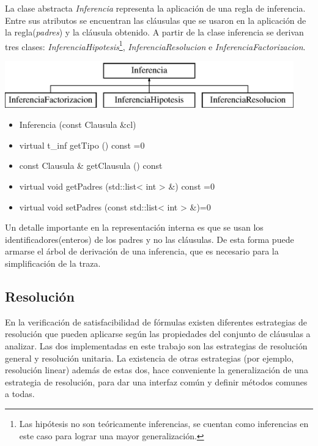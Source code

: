 \documentclass[a4paper,12pt]{article}
\begin{document}
La clase abstracta \emph{Inferencia} representa la aplicación de una regla de inferencia. Entre sus atributos se encuentran
las cláusulas que se usaron en la aplicación de la regla(\emph{padres}) y la cláusula obtenido. A partir de
la clase inferencia se derivan tres clases: \emph{InferenciaHipotesis}\footnote{Las hipótesis no son teóricamente
inferencias, se cuentan como inferencias en este caso para lograr una mayor generalización.}, \emph{InferenciaResolucion} e
\emph{InferenciaFactorizacion}.
\begin{center}
\leavevmode
\includegraphics[height=2cm]{imagenes/classInferencia}
\end{center}
\begin{itemize}
\renewcommand{\labelitemi}{$\bullet$}
\item Inferencia (const Clausula \&cl)
\item virtual t\_inf getTipo () const =0
\item const Clausula \& getClausula () const
\item virtual void getPadres (std::list< int > \&) const =0
\item virtual void setPadres (const std::list< int > \&)=0
\end{itemize}
Un detalle importante en la representación interna es que se usan los identificadores(enteros) de los padres
y no las cláusulas. De esta forma puede armarse el árbol de derivación de una inferencia, que es
necesario para la simplificación de la traza.
\subsection{Resolución}
En la verificación de satisfacibilidad de fórmulas existen diferentes estrategias de resolución que pueden
aplicarse según las propiedades del conjunto de cláusulas a analizar. Las dos implementadas en este
trabajo son las estrategias de resolución general y resolución unitaria. La existencia de otras estrategias
(por ejemplo, resolución linear) además de estas dos, hace conveniente la generalización de una estrategia de
resolución, para dar una interfaz común y definir métodos comunes a todas.
\end{document}
